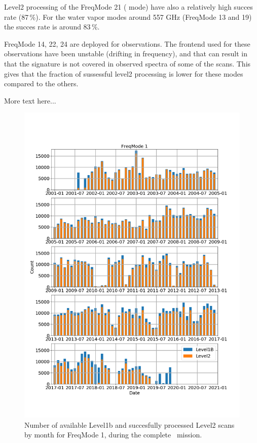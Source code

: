Level2 processing of the FreqMode 21 ( mode) have also
a relatively high succes rate (87\,\%).
For the water vapor modes around 557 GHz (FreqMode
13 and 19) the succes rate is around 83\,\%.
 


FreqMode 14, 22, 24 are deployed for  observations.
The frontend used for these observations have been unstable
(drifting in frequency), and that can result in that the 
 signature is not covered in observed spectra 
of some of the scans. This gives that the fraction of
sussessful level2 processing is lower for these modes
compared to the others.
 
More text here...




\begin{figure}[t]
\centering
\includegraphics[width=1.0\textwidth]{l2cad-fm1.png}
\caption{Number of available Level1b and succesfully processed Level2
scans by month for FreqMode 1, during the complete \smr\ mission.}
\label{fig:l2cad-fm1}
\end{figure}

